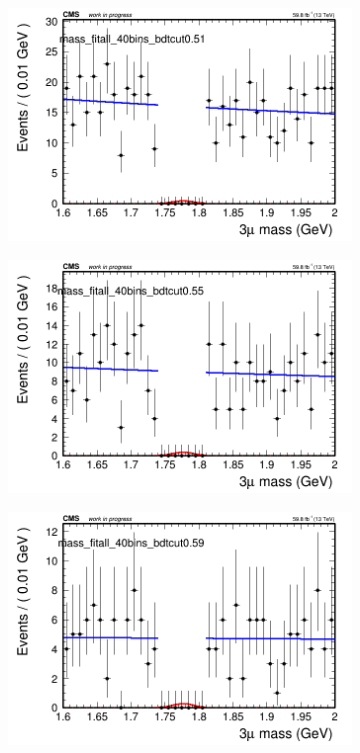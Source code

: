 \begin{figure}[H]
\begin{subfigure}{0.2\textwidth}
        \caption{}
    \end{subfigure}
    \begin{subfigure}{0.2\textwidth}
        \includegraphics[width=\textwidth]{power_law/plots/all/massfit_all_40bins_bdtcut0.51.png}
        \caption{}
    \end{subfigure}
    \begin{subfigure}{0.2\textwidth}
        \includegraphics[width=\textwidth]{power_law/plots/all/massfit_all_40bins_bdtcut0.55.png}
        \caption{}
    \end{subfigure}
    \begin{subfigure}{0.2\textwidth}
        \includegraphics[width=\textwidth]{power_law/plots/all/massfit_all_40bins_bdtcut0.59.png}

\end{subfigure}
\end{figure}
